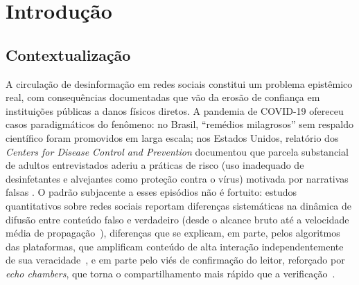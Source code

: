 
\chapter{Introdu\c{c}\~ao}
\label{cap:introducao}

\section{Contextualiza\c{c}\~ao}
\label{sec:contexto}

A circula\c{c}\~ao de desinforma\c{c}\~ao em redes sociais constitui um
problema epist\^emico real, com consequ\^encias documentadas que v\~ao
da eros\~ao de confian\c{c}a em institui\c{c}\~oes p\'ublicas
\cite{ieee_fakenewslandscape, scielo_posttruth} a danos f\'isicos
diretos. A pandemia de COVID-19 ofereceu casos paradigm\'aticos do
fen\^omeno: no Brasil, ``rem\'edios milagrosos'' sem respaldo
cient\'ifico foram promovidos em larga escala; nos Estados Unidos,
relat\'orio dos \emph{Centers for Disease Control and Prevention}
documentou que parcela substancial de adultos entrevistados aderiu a
pr\'aticas de risco (uso inadequado de desinfetantes e alvejantes
como prote\c{c}\~ao contra o v\'irus) motivada por narrativas falsas
\cite{gharpure2020cdc}. O padr\~ao subjacente a esses epis\'odios n\~ao
\'e fortuito: estudos quantitativos sobre redes sociais reportam
diferen\c{c}as sistem\'aticas na din\^amica de difus\~ao entre
conte\'udo falso e verdadeiro (desde o alcance bruto at\'e a
velocidade m\'edia de propaga\c{c}\~ao~\cite{vosoughi2018spread}),
diferen\c{c}as que se explicam, em parte, pelos algoritmos das
plataformas, que amplificam conte\'udo de alta intera\c{c}\~ao
independentemente de sua veracidade~\cite{bakshy2015exposure}, e em
parte pelo vi\'es de confirma\c{c}\~ao do leitor, refor\c{c}ado por
\emph{echo chambers}, que torna o compartilhamento mais r\'apido que a
verifica\c{c}\~ao~\cite{delvicario2016spreading}.

